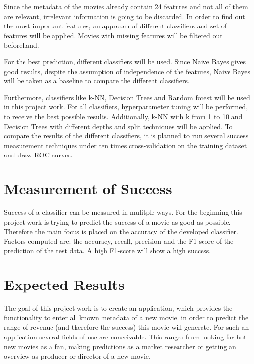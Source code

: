 Since the metadata of the movies already contain 24 features and not all of them are relevant, irrelevant information is going to be discarded. In order to find out the most important features, an approach of different classifiers and set of features will be applied. Movies with missing features will be filtered out beforehand. 

For the best prediction, different classifiers will be used. Since Naive Bayes gives good results, despite the assumption of independence of the features, Naive Bayes will be taken as a baseline to compare the different classifiers.

Furthermore, classifiers like k-NN, Decision Trees and Random forest will be used in this project work. For all classifiers, hyperparameter tuning will be performed, to receive the best possible results. Additionally, k-NN with k from 1 to 10 and Decision Trees with different depths and split techniques will be applied.
To compare the results of the different classifiers, it is planned to run several success measurement techniques under ten times cross-validation on the training dataset and draw ROC curves.


\section{Measurement of Success}
Success of a classifier can be measured in mulitple ways. For the beginning this project work is trying to predict the success of a movie as good as possible. Therefore the main focus is placed on the accuracy of the developed classifier.
 Factors computed are: the accuracy, recall, precision and the F1 score of the prediction of the test data. A high F1-score will show a high success.

\section{Expected Results}
The goal of this project work is to create an application, which provides the functionality to enter all known metadata of a new movie, in order to predict the range of revenue (and therefore the success) this movie will generate. For such an application several fields of use are conceivable. This ranges from looking for hot new movies as a fan, making predictions as a market researcher or getting an overview as producer or director of a new movie.





